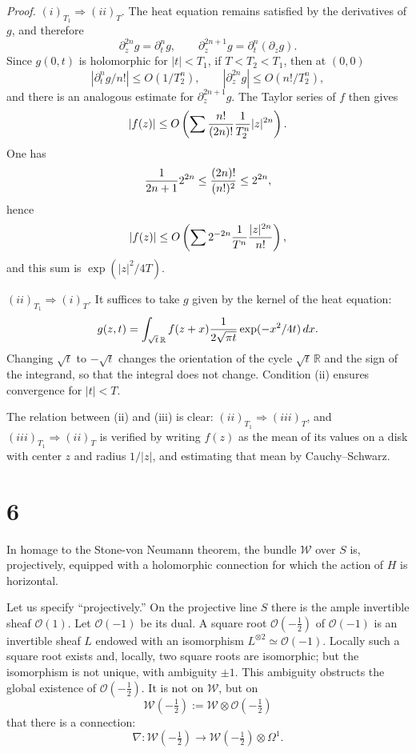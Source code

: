 \documentclass[11pt]{article}
\newcommand{\R}{\mathbb R}
\newcommand{\cO}{\mathcal O}
\newcommand{\cW}{\mathcal W}
\newcommand{\dd}{\,d}
\newcommand{\half}{\tfrac12}
\begin{document}
\emph{Proof.} $(i)_{T_1}\Rightarrow(ii)_T$. The heat equation remains satisfied by the derivatives of $g$, and therefore
\[
\partial_z^{2n}g=\partial_t^n g,
\qquad
\partial_z^{2n+1}g=\partial_t^n(\partial_z g).
\]
Since $g(0,t)$ is holomorphic for $|t|<T_1$, if $T<T_2<T_1$, then at $(0,0)$
\[
|\partial_t^n g/n!|\le O(1/T_2^n),
\qquad
|\partial_z^{2n}g|\le O(n!/T_2^n),
\]
and there is an analogous estimate for $\partial_z^{2n+1}g$. The Taylor series of $f$ then gives
\[
|f(z)|\le O\left(\sum {n!\over(2n)!}{1\over T_2^n}|z|^{2n}\right).
\]
One has
\[
{1\over2n+1}2^{2n}\le{(2n)!\over(n!)^2}\le 2^{2n},
\]
hence
\[
|f(z)|\le O\left(\sum 2^{-2n}{1\over T^n}{|z|^{2n}\over n!}\right),
\]
and this sum is $\exp(|z|^2/4T)$.

$(ii)_{T_1}\Rightarrow(i)_T$. It suffices to take $g$ given by the kernel of the heat equation:
\[
g(z,t)=\int_{\sqrt t\,\R} f(z+x){1\over2\sqrt{\pi t}}\exp(-x^2/4t)\dd x.
\]
Changing $\sqrt t$ to $-\sqrt t$ changes the orientation of the cycle $\sqrt t\,\R$ and the sign of the integrand, so that the integral does not change. Condition (ii) ensures convergence for $|t|<T$.

The relation between (ii) and (iii) is clear: $(ii)_{T_1}\Rightarrow(iii)_T$, and $(iii)_{T_1}\Rightarrow(ii)_T$ is verified by writing $f(z)$ as the mean of its values on a disk with center $z$ and radius $1/|z|$, and estimating that mean by Cauchy--Schwarz.

\section*{6}
In homage to the Stone-von Neumann theorem, the bundle $\cW$ over $S$ is, projectively, equipped with a holomorphic connection for which the action of $H$ is horizontal.

Let us specify ``projectively.'' On the projective line $S$ there is the ample invertible sheaf $\cO(1)$. Let $\cO(-1)$ be its dual. A square root $\cO(-\half)$ of $\cO(-1)$ is an invertible sheaf $L$ endowed with an isomorphism $L^{\otimes2}\simeq\cO(-1)$. Locally such a square root exists and, locally, two square roots are isomorphic; but the isomorphism is not unique, with ambiguity $\pm1$. This ambiguity obstructs the global existence of $\cO(-\half)$. It is not on $\cW$, but on
\[
\cW(-\half):=\cW\otimes\cO(-\half)
\]
that there is a connection:
\begin{equation}\tag{6.1}
\nabla:\cW(-\half)\longrightarrow \cW(-\half)\otimes\Omega^1.
\end{equation}
\end{document}
